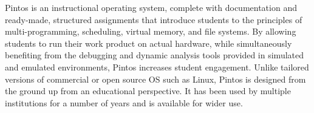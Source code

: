 Pintos is an instructional operating system, complete with documentation
and ready-made, structured assignments that introduce students to
the principles of multi-programming, scheduling, virtual memory,
and file systems.  By allowing students to run their work product on
actual hardware, while simultaneously benefiting from the debugging
and dynamic analysis tools provided in simulated and emulated environments,
Pintos increases student engagement.  Unlike tailored versions of
commercial or open source OS such as Linux, Pintos is designed from the
ground up from an educational perspective.  
It has been used by multiple institutions for a number of years and
is available for wider use.
